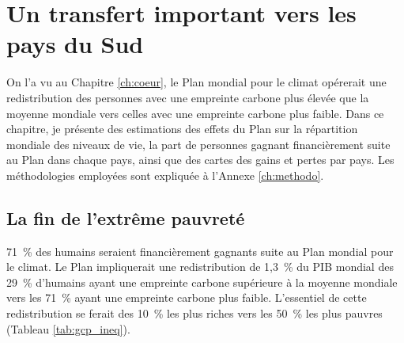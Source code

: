 \documentclass[a5paper,french,openany]{memoir}
\begin{document}



\chapter{Un transfert important vers les pays du Sud\label{ch:effets_distributifs}}

On l'a vu au Chapitre \ref{ch:coeur}, le Plan mondial pour le climat opérerait une redistribution des personnes avec une empreinte carbone plus élevée que la moyenne mondiale vers celles avec une empreinte carbone plus faible. Dans ce chapitre, je présente des estimations des effets du Plan sur la répartition mondiale des niveaux de vie, la part de personnes gagnant financièrement suite au Plan dans chaque pays, ainsi que des cartes des gains et pertes par pays. Les méthodologies employées sont expliquée à l'Annexe \ref{ch:methodo}.

\section{La fin de l'extrême pauvreté}\label{sec:fin_pauvrete}

71~\% des humains seraient financièrement gagnants suite au Plan mondial pour le climat. Le Plan impliquerait une redistribution de 1,3~\% du PIB mondial des 29~\% d'humains ayant une empreinte carbone supérieure à la moyenne mondiale vers les 71~\% ayant une empreinte carbone plus faible. L'essentiel %
de cette redistribution se ferait des 10~\% les plus riches vers les 50~\% les plus pauvres (Tableau \ref{tab:gcp_ineq}). 
\end{document}
